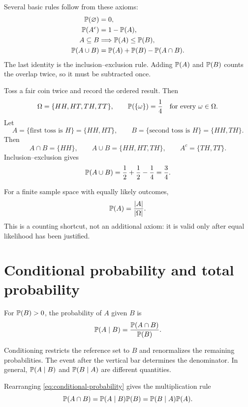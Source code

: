 Several basic rules follow from these axioms:
\begin{align}
  \mathbb{P}(\varnothing)&=0,\label{eq:empty}\\
  \mathbb{P}(A^c)&=1-\mathbb{P}(A),\label{eq:complement}\\
  A\subseteq B&\Longrightarrow \mathbb{P}(A)\le \mathbb{P}(B),\label{eq:monotonicity}\\
  \mathbb{P}(A\cup B)&=\mathbb{P}(A)+\mathbb{P}(B)-\mathbb{P}(A\cap B).
  \label{eq:inclusion-exclusion}
\end{align}
The last identity is the inclusion--exclusion rule. Adding \(\mathbb{P}(A)\) and
\(\mathbb{P}(B)\) counts the overlap twice, so it must be subtracted once.

\begin{example}
Toss a fair coin twice and record the ordered result. Then
\[
  \Omega=\{HH,HT,TH,TT\},
  \qquad \mathbb{P}(\{\omega\})=\frac14
  \quad\text{for every }\omega\in\Omega.
\]
Let
\[
  A=\{\text{first toss is }H\}=\{HH,HT\},
  \qquad
  B=\{\text{second toss is }H\}=\{HH,TH\}.
\]
Then
\[
  A\cap B=\{HH\},\qquad
  A\cup B=\{HH,HT,TH\},\qquad
  A^c=\{TH,TT\}.
\]
Inclusion--exclusion gives
\[
  \mathbb{P}(A\cup B)=\frac12+\frac12-\frac14=\frac34.
\]
\end{example}

For a finite sample space with equally likely outcomes,
\[
  \mathbb{P}(A)=\frac{|A|}{|\Omega|}.
\]
This is a counting shortcut, not an additional axiom: it is valid only after
equal likelihood has been justified.

\section{Conditional probability and total probability}

\begin{definition}
For \(\mathbb{P}(B)>0\), the probability of \(A\) given \(B\) is
\begin{equation}
  \mathbb{P}(A\mid B)=\frac{\mathbb{P}(A\cap B)}{\mathbb{P}(B)}.
  \label{eq:conditional-probability}
\end{equation}
\end{definition}

Conditioning restricts the reference set to \(B\) and renormalizes the
remaining probabilities. The event after the vertical bar determines the
denominator. In general, \(\mathbb{P}(A\mid B)\) and \(\mathbb{P}(B\mid A)\) are
different quantities.

Rearranging \eqref{eq:conditional-probability} gives the multiplication rule
\begin{equation}
  \mathbb{P}(A\cap B)=\mathbb{P}(A\mid B)\mathbb{P}(B)
  =\mathbb{P}(B\mid A)\mathbb{P}(A).
  \label{eq:multiplication-rule}
\end{equation}

